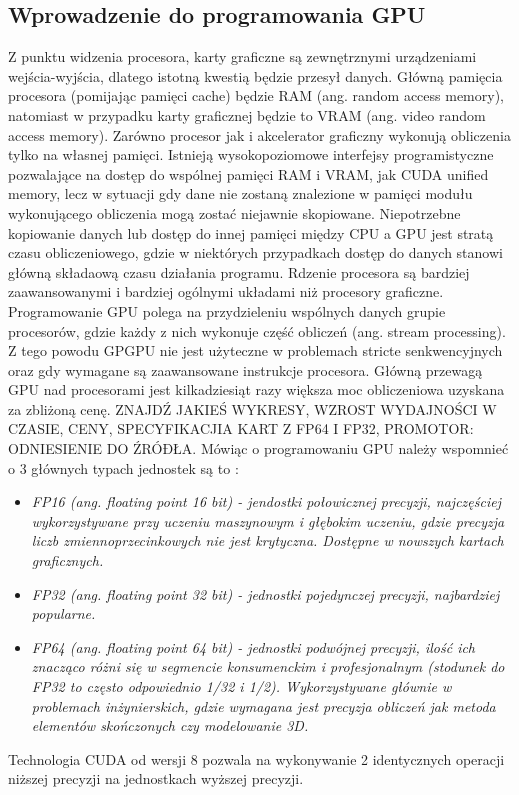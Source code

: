 \subsection{Wprowadzenie do programowania GPU}
Z punktu widzenia procesora, karty graficzne są zewnętrznymi urządzeniami wejścia-wyjścia, dlatego istotną kwestią będzie przesył danych. Główną pamięcia procesora (pomijając pamięci cache) będzie RAM (ang. random access memory), natomiast w przypadku karty graficznej będzie to VRAM (ang. video random access memory). Zarówno procesor jak i akcelerator graficzny wykonują obliczenia tylko na własnej pamięci. Istnieją wysokopoziomowe interfejsy programistyczne pozwalające na dostęp do wspólnej pamięci RAM i VRAM, jak CUDA unified memory, lecz w sytuacji gdy dane nie zostaną znalezione w pamięci modułu wykonującego obliczenia mogą zostać niejawnie skopiowane. Niepotrzebne kopiowanie danych lub dostęp do innej pamięci między CPU a GPU jest stratą czasu obliczeniowego, gdzie w niektórych przypadkach dostęp do danych stanowi główną składaową czasu działania programu. Rdzenie procesora są bardziej zaawansowanymi i bardziej ogólnymi układami niż procesory graficzne. Programowanie GPU polega na przydzieleniu wspólnych danych grupie procesorów, gdzie każdy z nich wykonuje część obliczeń (ang. stream processing). Z tego powodu GPGPU nie jest użyteczne w problemach stricte senkwencyjnych oraz gdy wymagane są zaawansowane instrukcje procesora. Główną przewagą GPU nad procesorami jest kilkadziesiąt razy większa moc obliczeniowa uzyskana za zbliżoną cenę. ZNAJDŹ JAKIEŚ WYKRESY, WZROST WYDAJNOŚCI W CZASIE, CENY, SPECYFIKACJIA KART Z FP64 I FP32, PROMOTOR: ODNIESIENIE DO ŹRÓÐŁA. Mówiąc o programowaniu GPU należy wspomnieć o 3 głównych typach jednostek są to :
\begin{itemize}
	\item \it{FP16} (ang. floating point 16 bit) - jendostki połowicznej precyzji, najczęściej wykorzystywane przy uczeniu maszynowym i głębokim uczeniu, gdzie precyzja liczb zmiennoprzecinkowych nie jest krytyczna. Dostępne w nowszych kartach graficznych.
	\item \it{FP32} (ang. floating point 32 bit) - jednostki pojedynczej precyzji, najbardziej popularne.
	\item \it{FP64} (ang. floating point 64 bit) - jednostki podwójnej precyzji, ilość ich znacząco różni się w segmencie konsumenckim i profesjonalnym (stodunek do FP32 to często odpowiednio 1/32 i 1/2). Wykorzystywane głównie w problemach inżynierskich, gdzie wymagana jest precyzja obliczeń jak metoda elementów skończonych czy modelowanie 3D.
\end{itemize}
Technologia CUDA od wersji 8 pozwala na wykonywanie 2 identycznych operacji niższej precyzji na jednostkach wyższej precyzji. \cite{Mix16}

